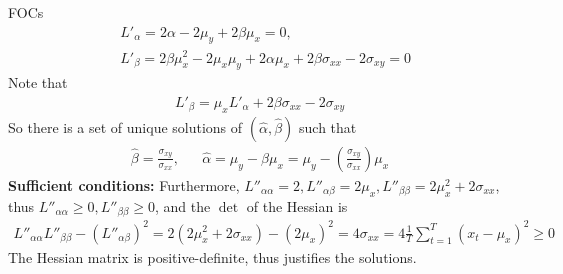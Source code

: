 \documentclass[10pt,a4paper]{book}
\theoremstyle{definition}\newtheorem{definition}{Definition}
\theoremstyle{definition}\newtheorem{fact}{Fact}
\theoremstyle{definition}\newtheorem{ex}{Ex.}
\theoremstyle{definition}\newtheorem{project}{Project}
\theoremstyle{definition}\newtheorem{problem}{Problem}
\theoremstyle{definition}\newtheorem{example}{Example}
\numberwithin{theorem}{chapter}
\numberwithin{corollary}{chapter}
\numberwithin{assumption}{chapter}
\numberwithin{definition}{chapter}
\numberwithin{prop}{chapter}
\numberwithin{notation}{chapter}
\numberwithin{problem}{chapter}
\numberwithin{example}{chapter}
\numberwithin{fact}{chapter}
\numberwithin{ex}{chapter}
\begin{document}
	FOCs
	\begin{align*}
		& L'_\alpha = 2\alpha - 2\mu_y + 2\beta\mu_x = 0,                                              \\
		& L'_\beta = 2\beta\mu_x^2 - 2\mu_x\mu_y + 2\alpha\mu_x + 2\beta\sigma_{xx} - 2\sigma_{xy} = 0 
	\end{align*}
	Note that
	\begin{align*}
		L'_\beta = \mu_x L'_\alpha + 2\beta \sigma_{xx} - 2 \sigma_{x y} 
	\end{align*}
	So there is a set of unique solutions of $(\hat{\alpha}, \hat{\beta})$ such that
	\begin{align*}
		\hat{\beta} = \frac{\sigma_{xy}}{\sigma_{xx}}, &   & \hat{\alpha} = \mu_y - \hat{\beta} \mu_x = \mu_y - \left(\frac{\sigma_{xy}}{\sigma_{xx}}\right) \mu_x 
	\end{align*}
	\textbf{Sufficient conditions:} Furthermore, $L''_{\alpha\alpha} = 2, L''_{\alpha\beta} = 2\mu_x, L''_{\beta\beta} = 2\mu_x^2 + 2\sigma_{xx}$, thus $L''_{\alpha\alpha} \geq 0, L''_{\beta\beta} \geq 0$, and the $\det$ of the Hessian is
	\begin{align*}
		L''_{\alpha\alpha} L''_{\beta\beta} - (L''_{\alpha\beta})^2 = 2(2\mu_x^2+2\sigma_{xx}) - (2\mu_x)^2 =  4\sigma_{xx} = 4\frac{1}{T} \sum^T_{t=1} (x_t - \mu_x)^2 \geq 0 
	\end{align*} 
	The Hessian matrix is positive-definite, thus justifies the solutions.
	
\end{document}
